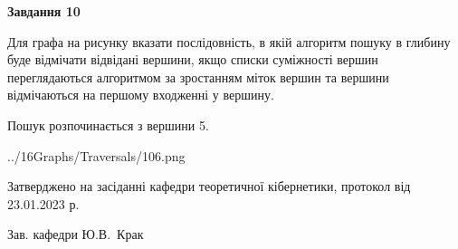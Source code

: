 \documentclass[12pt, ukrainian]{article}
\begin{document}
{\begin {large}
{\begin {center}\textbf{Завдання 10}\end {center}}\par
Для графа на рисунку вказати послідовність, в якій алгоритм пошуку в глибину буде відмічати відвідані вершини, якщо списки суміжності вершин переглядаються алгоритмом за зростанням міток вершин та вершини відмічаються на першому вход\-женні у вершину.\par
Пошук розпочинається з вершини 5.\par

\begin{center}
	{../16Graphs/Traversals/106.png}
\end{center}\par
\newpage


\end {large}
}
{\smallskip \begin {small} Затверджено на засіданні кафедри теоретичної кібернетики, протокол  від   23.01.2023 р.\par\smallskip\smallskip
{\parbox {6.5 cm}{Зав. кафедри \dotfill Ю.В.~Крак}} \end{small}}
\end{document}
